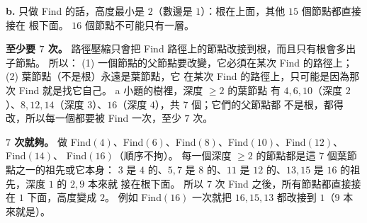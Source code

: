 \begin{pastsoln}
\textbf{b.} 只做 Find 的話，高度最小是 $2$（數邊是 $1$）：根在上面，其他 $15$ 個節點都直接接在
根下面。 $16$ 個節點不可能只有一層。

\textbf{至少要 $7$ 次。} 路徑壓縮只會把 Find 路徑上的節點改接到根，而且只有根會多出子節點。 所以：
(1) 一個節點的父節點要改變，它必須在某次 Find 的路徑上；(2) 葉節點（不是根）永遠是葉節點，它
在某次 Find 的路徑上，只可能是因為那次 Find 就是找它自己。 a 小題的樹裡，深度 $\ge 2$ 的葉節點
有 $4, 6, 10$（深度 $2$）、$8, 12, 14$（深度 $3$）、$16$（深度 $4$），共 $7$ 個；它們的父節點都
不是根，都得改，所以每一個都要被 Find 一次，至少 $7$ 次。

\textbf{$7$ 次就夠。} 做 Find$(4)$、Find$(6)$、Find$(8)$、Find$(10)$、Find$(12)$、Find$(14)$、
Find$(16)$（順序不拘）。 每一個深度 $\ge 2$ 的節點都是這 $7$ 個葉節點之一的祖先或它本身：
$3$ 是 $4$ 的、$5, 7$ 是 $8$ 的、$11$ 是 $12$ 的、$13, 15$ 是 $16$ 的祖先，深度 $1$ 的 $2, 9$ 本來就
接在根下面。 所以 $7$ 次 Find 之後，所有節點都直接接在 $1$ 下面，高度變成 $2$。 例如 Find$(16)$
一次就把 $16, 15, 13$ 都改接到 $1$（$9$ 本來就是）。
\end{pastsoln}
